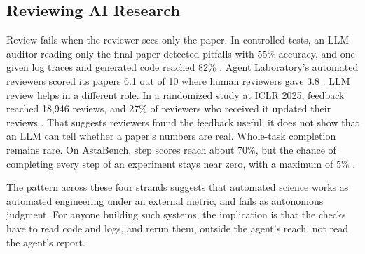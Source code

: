 \subsection{Reviewing AI Research}\label{sec:science-review}

Review fails when the reviewer sees only the paper. In controlled tests, an LLM auditor reading only the final paper detected pitfalls with 55\% accuracy, and one given log traces and generated code reached 82\% \citep{S10}. Agent Laboratory's automated reviewers scored its papers 6.1 out of 10 where human reviewers gave 3.8 \citep{S3}. LLM review helps in a different role. In a randomized study at ICLR 2025, feedback reached 18,946 reviews, and 27\% of reviewers who received it updated their reviews \citep{S29}. That suggests reviewers found the feedback useful; it does not show that an LLM can tell whether a paper's numbers are real. Whole-task completion remains rare. On AstaBench, step scores reach about 70\%, but the chance of completing every step of an experiment stays near zero, with a maximum of 5\% \citep{S19}.

The pattern across these four strands suggests that automated science works as automated engineering under an external metric, and fails as autonomous judgment. For anyone building such systems, the implication is that the checks have to read code and logs, and rerun them, outside the agent's reach, not read the agent's report.
